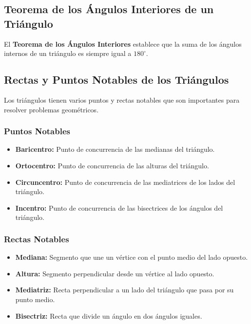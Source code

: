 \subsection{Teorema de los Ángulos Interiores de un Triángulo}

El \textbf{Teorema de los Ángulos Interiores} establece que la suma de los ángulos internos de un triángulo es siempre igual a \( 180^\circ \).


\subsection{Rectas y Puntos Notables de los Triángulos}

Los triángulos tienen varios puntos y rectas notables que son importantes para resolver problemas geométricos.

\subsubsection{Puntos Notables}

\begin{itemize}
    \item \textbf{Baricentro:} Punto de concurrencia de las medianas del triángulo.
    \item \textbf{Ortocentro:} Punto de concurrencia de las alturas del triángulo.
    \item \textbf{Circuncentro:} Punto de concurrencia de las mediatrices de los lados del triángulo.
    \item \textbf{Incentro:} Punto de concurrencia de las bisectrices de los ángulos del triángulo.
\end{itemize}

\subsubsection{Rectas Notables}

\begin{itemize}
    \item \textbf{Mediana:} Segmento que une un vértice con el punto medio del lado opuesto.
    \item \textbf{Altura:} Segmento perpendicular desde un vértice al lado opuesto.
    \item \textbf{Mediatriz:} Recta perpendicular a un lado del triángulo que pasa por su punto medio.
    \item \textbf{Bisectriz:} Recta que divide un ángulo en dos ángulos iguales.
\end{itemize}

